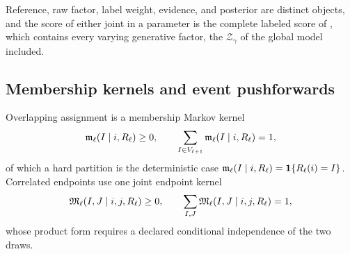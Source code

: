 Reference, raw factor, label weight, evidence, and posterior are distinct objects,
and the score of either joint in a parameter is the complete labeled score of
, which contains every varying generative
factor, the $\mathcal Z_\gamma$ of the global model included.

\subsection{Membership kernels and event pushforwards}

Overlapping assignment is a membership Markov kernel
\begin{equation}
\mathfrak m_\ell(I\mid i,R_\ell)\ge0,
\qquad
\sum_{I\in V_{\ell+1}}\mathfrak m_\ell(I\mid i,R_\ell)=1,
\label{eq:full-graph-membership-kernel}
\end{equation}
of which a hard partition is the deterministic case $\mathfrak m_\ell(I\mid
i,R_\ell)=\mathbf 1\{R_\ell(i)=I\}$. Correlated endpoints use one joint endpoint
kernel
\begin{equation}
\mathfrak M_\ell(I,J\mid i,j,R_\ell)\ge0,
\qquad
\sum_{I,J}\mathfrak M_\ell(I,J\mid i,j,R_\ell)=1,
\label{eq:full-graph-joint-endpoint-kernel}
\end{equation}
whose product form requires a declared conditional independence of the two draws.


